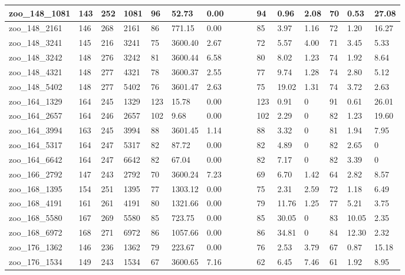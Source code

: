 \begin{landscape}
\begin{longtable}{llllllllllllllll}
zoo\_148\_1081 & 143 & 252 & 1081 & 96 & 52.73 & 0.00 &  &  &  & 94 & 0.96 & 2.08 & 70 & 0.53 & 27.08 \\ \hline 
zoo\_148\_2161 & 146 & 268 & 2161 & 86 & 771.15 & 0.00 &  &  &  & 85 & 3.97 & 1.16 & 72 & 1.20 & 16.27 \\ \hline 
zoo\_148\_3241 & 145 & 216 & 3241 & 75 & 3600.40 & 2.67 &  &  &  & 72 & 5.57 & 4.00 & 71 & 3.45 & 5.33 \\ \hline 
zoo\_148\_3242 & 148 & 276 & 3242 & 81 & 3600.44 & 6.58 &  &  &  & 80 & 8.02 & 1.23 & 74 & 1.92 & 8.64 \\ \hline 
zoo\_148\_4321 & 148 & 277 & 4321 & 78 & 3600.37 & 2.55 &  &  &  & 77 & 9.74 & 1.28 & 74 & 2.80 & 5.12 \\ \hline 
zoo\_148\_5402 & 148 & 277 & 5402 & 76 & 3601.47 & 2.63 &  &  &  & 75 & 19.02 & 1.31 & 74 & 3.72 & 2.63 \\ \hline 
zoo\_164\_1329 & 164 & 245 & 1329 & 123 & 15.78 & 0.00 &  &  &  & 123 & 0.91 & 0 & 91 & 0.61 & 26.01 \\ \hline 
zoo\_164\_2657 & 164 & 246 & 2657 & 102 & 9.68 & 0.00 &  &  &  & 102 & 2.29 & 0 & 82 & 1.23 & 19.60 \\ \hline 
zoo\_164\_3994 & 163 & 245 & 3994 & 88 & 3601.45 & 1.14 &  &  &  & 88 & 3.32 & 0 & 81 & 1.94 & 7.95 \\ \hline 
zoo\_164\_5317 & 164 & 247 & 5317 & 82 & 87.72 & 0.00 &  &  &  & 82 & 4.89 & 0 & 82 & 2.65 & 0 \\ \hline 
zoo\_164\_6642 & 164 & 247 & 6642 & 82 & 67.04 & 0.00 &  &  &  & 82 & 7.17 & 0 & 82 & 3.39 & 0 \\ \hline 
zoo\_166\_2792 & 147 & 243 & 2792 & 70 & 3600.24 & 7.23 &  &  &  & 69 & 6.70 & 1.42 & 64 & 2.82 & 8.57 \\ \hline 
zoo\_168\_1395 & 154 & 251 & 1395 & 77 & 1303.12 & 0.00 &  &  &  & 75 & 2.31 & 2.59 & 72 & 1.18 & 6.49 \\ \hline 
zoo\_168\_4191 & 161 & 261 & 4191 & 80 & 1321.66 & 0.00 &  &  &  & 79 & 11.76 & 1.25 & 77 & 5.21 & 3.75 \\ \hline 
zoo\_168\_5580 & 167 & 269 & 5580 & 85 & 723.75 & 0.00 &  &  &  & 85 & 30.05 & 0 & 83 & 10.05 & 2.35 \\ \hline 
zoo\_168\_6972 & 168 & 271 & 6972 & 86 & 1057.66 & 0.00 &  &  &  & 86 & 34.81 & 0 & 84 & 12.30 & 2.32 \\ \hline 
zoo\_176\_1362 & 146 & 236 & 1362 & 79 & 223.67 & 0.00 &  &  &  & 76 & 2.53 & 3.79 & 67 & 0.87 & 15.18 \\ \hline 
zoo\_176\_1534 & 149 & 243 & 1534 & 67 & 3600.65 & 7.16 &  &  &  & 62 & 6.45 & 7.46 & 61 & 1.92 & 8.95 \\ \hline 

\end{longtable}
\end{landscape}

